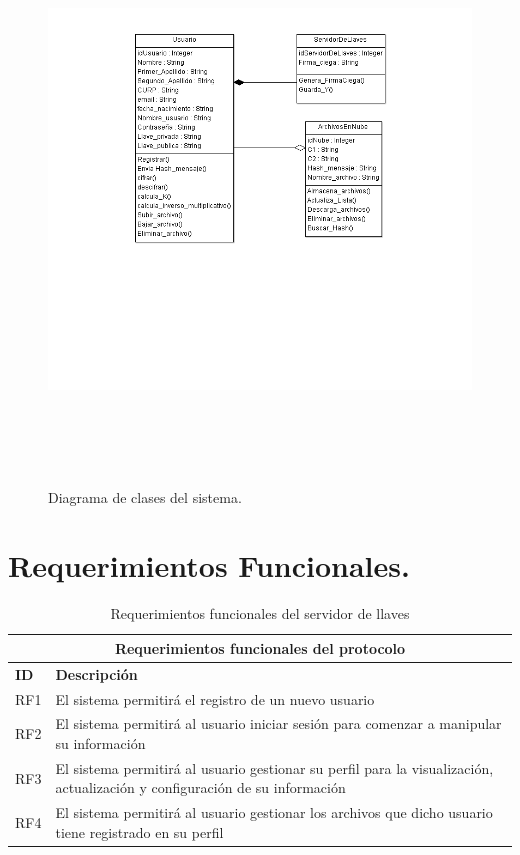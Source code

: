 \begin{figure}[H]
\centering
\includegraphics[width=18cm, height=15cm]{./images/DiagramaClasesTT.png}
\caption{Diagrama de clases del sistema.}

\end{figure} 
\newpage
\section{Requerimientos Funcionales. }

\begin{table}[htb]
\centering
\begin{tabular}{| p{2cm} | p{13.5cm} |}
\hline
\multicolumn{2}{|c|}{\textbf{Requerimientos funcionales del protocolo}} \\ \hline
\textbf{ID} & \textbf{Descripción} \\
\hline \hline
RF1 & El sistema permitirá el registro de un nuevo usuario \\ \hline
RF2 & El sistema permitirá al usuario iniciar sesión para comenzar a manipular su información \\ \hline
RF3 & El sistema permitirá al usuario gestionar su perfil para la visualización, actualización y configuración de su información \\ \hline
RF4 & El sistema permitirá al usuario gestionar los archivos que dicho usuario tiene registrado en su perfil \\ \hline

\end{tabular}
\caption{Requerimientos funcionales del servidor de llaves}
\label{Servidor de Llaves }
\end{table}




